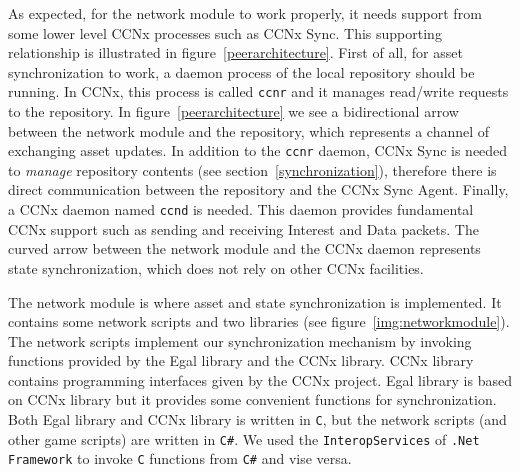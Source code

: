 \documentclass{article}
\begin{document}
As expected, for the network module to work properly, it needs support from some lower level CCNx processes such as CCNx Sync. This supporting relationship is illustrated in figure~\ref{peerarchitecture}. First of all, for asset synchronization to work, a daemon process of the local repository should be running. In CCNx, this process is called \texttt{ccnr} and it manages read\slash write requests to the repository. In figure~\ref{peerarchitecture} we see a bidirectional arrow between the network module and the repository, which represents a channel of exchanging asset updates. In addition to the \texttt{ccnr} daemon, CCNx Sync is needed to \emph{manage} repository contents (see section~\ref{synchronization}), therefore there is direct communication between the repository and the CCNx Sync Agent. Finally, a CCNx daemon named \texttt{ccnd} is needed. This daemon provides fundamental CCNx support such as sending and receiving Interest and Data packets. The curved arrow between the network module and the CCNx daemon represents state synchronization, which does not rely on other CCNx facilities.

The network module is where asset and state synchronization is implemented. It contains some network scripts and two libraries (see figure~\ref{img:networkmodule}). The network scripts implement our synchronization mechanism by invoking functions provided by the Egal library and the CCNx library. CCNx library contains programming interfaces given by the CCNx project. Egal library is based on CCNx library but it provides some convenient functions for synchronization. Both Egal library and CCNx library is written in \texttt{C}, but the network scripts (and other game scripts) are written in \texttt{C\#}. We used the \texttt{InteropServices} of \texttt{.Net Framework} to invoke \texttt{C} functions from \texttt{C\#} and vise versa.

\def\tboxl[#1,#2,#3,#4,#5]#6{%
  \node[draw,, minimum height=#1, minimum width=#2, %
  inner color=white, outer color=white, color=black] (#4) at #5 {}; %
  \node[anchor=#3,inner sep=2pt] at (#4.#3) {#6};%
}

\def\entity[#1,#2]#3;{
  \node[draw,,color=black,fill=white,rounded corners=3] (#1) at #2 {#3};
}

\def\isaedge[#1,#2,#3,#4];{ 
  \draw[<->,color=black!20!black,#4,fill=white] (#1) -- #3
  (#2);  
}
\end{document}
